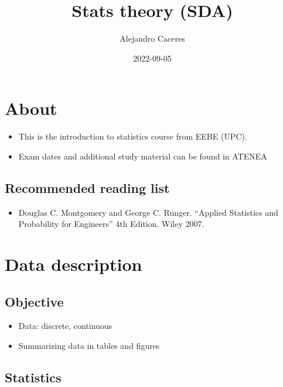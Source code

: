 \documentclass[
]{book}
\title{Stats theory (SDA)}
\author{Alejandro Caceres}
\date{2022-09-05}
\providecommand{\tightlist}{%
  \setlength{\itemsep}{0pt}\setlength{\parskip}{0pt}}
\begin{document}
\maketitle

{
\setcounter{tocdepth}{1}
\tableofcontents
}
\hypertarget{about}{%
\chapter{About}\label{about}}

\begin{itemize}
\item
  This is the introduction to statistics course from EEBE (UPC).
\item
  Exam dates and additional study material can be found in ATENEA
\end{itemize}

\hypertarget{recommended-reading-list}{%
\section{Recommended reading list}\label{recommended-reading-list}}

\begin{itemize}
\tightlist
\item
  Douglas C. Montgomery and George C. Runger. ``Applied Statistics and Probability for Engineers'' 4th Edition. Wiley 2007.
\end{itemize}

\hypertarget{data-description}{%
\chapter{Data description}\label{data-description}}

\hypertarget{objective}{%
\section{Objective}\label{objective}}

\begin{itemize}
\tightlist
\item
  Data: discrete, continuous
\item
  Summarizing data in tables and figures
\end{itemize}

\hypertarget{statistics}{%
\section{Statistics}\label{statistics}}
\end{document}
